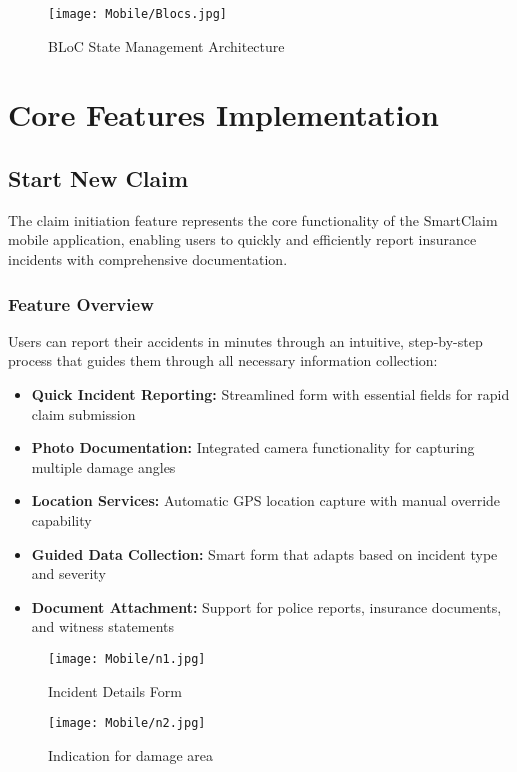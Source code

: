 \documentclass[12pt,a4paper]{report}
\begin{document}
\begin{figure}[H]
    \centering
    \texttt{[image: Mobile/Blocs.jpg]}
    \caption{BLoC State Management Architecture}
    \label{fig:bloc_architecture}
\end{figure}

\section{Core Features Implementation}

\subsection{Start New Claim}

The claim initiation feature represents the core functionality of the SmartClaim mobile application, enabling users to quickly and efficiently report insurance incidents with comprehensive documentation.

\subsubsection{Feature Overview}

Users can report their accidents in minutes through an intuitive, step-by-step process that guides them through all necessary information collection:

\begin{itemize}
    \item \textbf{Quick Incident Reporting:} Streamlined form with essential fields for rapid claim submission
    \item \textbf{Photo Documentation:} Integrated camera functionality for capturing multiple damage angles
    \item \textbf{Location Services:} Automatic GPS location capture with manual override capability
    \item \textbf{Guided Data Collection:} Smart form that adapts based on incident type and severity
    \item \textbf{Document Attachment:} Support for police reports, insurance documents, and witness statements
   
\end{itemize}

\begin{figure}[H]
    \centering
    \begin{minipage}{0.45\textwidth}
        \centering
        \texttt{[image: Mobile/n1.jpg]}
        \caption{Incident Details Form}
        \label{fig:start_claim1}
    \end{minipage}
    \hfill
    \begin{minipage}{0.45\textwidth}
        \centering
        \texttt{[image: Mobile/n2.jpg]}
        \caption{Indication for damage area}
        \label{fig:start_claim2}
    \end{minipage}
\end{figure}
\end{document}
